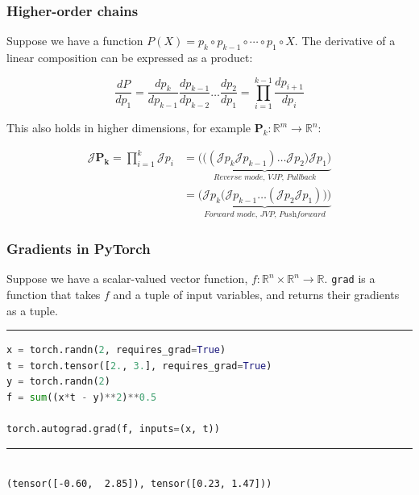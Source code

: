 \documentclass{beamer}
\begin{document}
    \begin{frame}
        \frametitle{Higher-order chains}

        Suppose we have a function $P(X) = p_k \circ p_{k-1} \circ \cdots \circ p_1 \circ X$. The derivative of a linear composition can be expressed as a product:

        \begin{equation*}
            \label{eq:sfun_chain_rule}
            \frac{dP}{dp_1} = \frac{dp_k}{dp_{k-1}}\frac{dp_{k-1}}{dp_{k-2}}\dots\frac{dp_2}{dp_1}= {\displaystyle \prod_{i=1}^{k-1} \frac{dp_{i+1}}{dp_{i}}}
        \end{equation*}

        This also holds in higher dimensions, for example $\mathbf{P}_k: \mathbb{R}^m\rightarrow\mathbb{R}^n$:

        \begin{align*}
            \label{eq:vfun_chain_rule}
            \mathcal{J} \mathbf{P_k} = \displaystyle \prod_{i=1}^{k} \mathcal{J}p_i &= \underbrace{\bigg(\Big((\mathcal{J}p_k \mathcal{J}p_{k-1}) \dots \mathcal{J}p_2\Big) \mathcal{J}p_1\bigg)}_{\textit{Reverse mode, VJP, Pullback}} \\
            &= \underbrace{\bigg(\mathcal{J}p_k \Big(\mathcal{J}p_{k-1} \dots (\mathcal{J}p_2 \mathcal{J}p_1)\Big)\bigg)}_{\textit{Forward mode, JVP, Pushforward}}
        \end{align*}
    \end{frame}

    \begin{frame}[fragile]
        \frametitle{Gradients in PyTorch}

        Suppose we have a scalar-valued vector function, $f: \mathbb{R}^{n}\times\mathbb{R}^{n}\rightarrow\mathbb{R}$.
        \texttt{grad} is a function that takes $f$ and a tuple of input variables, and returns their gradients as a tuple.

        \noindent\rule{\textwidth}{0.5pt}

        \begin{lstlisting}[language=Python]
x = torch.randn(2, requires_grad=True)
t = torch.tensor([2., 3.], requires_grad=True)
y = torch.randn(2)
f = sum((x*t - y)**2)**0.5

torch.autograd.grad(f, inputs=(x, t))
        \end{lstlisting}

        \noindent\rule{\textwidth}{0.5pt}
        \begin{lstlisting}

(tensor([-0.60,  2.85]), tensor([0.23, 1.47]))
        \end{lstlisting}
    \end{frame}
\end{document}
